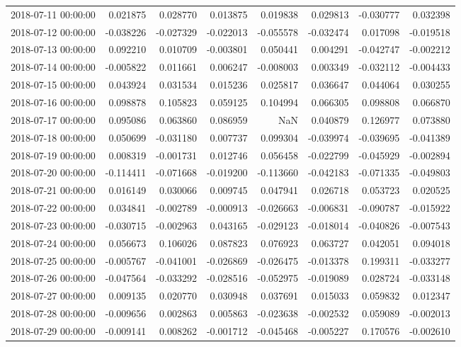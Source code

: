\begin{tabular}{lrrrrrrr}
2018-07-11 00:00:00 & 0.021875 & 0.028770 & 0.013875 & 0.019838 & 0.029813 & -0.030777 & 0.032398 \\
2018-07-12 00:00:00 & -0.038226 & -0.027329 & -0.022013 & -0.055578 & -0.032474 & 0.017098 & -0.019518 \\
2018-07-13 00:00:00 & 0.092210 & 0.010709 & -0.003801 & 0.050441 & 0.004291 & -0.042747 & -0.002212 \\
2018-07-14 00:00:00 & -0.005822 & 0.011661 & 0.006247 & -0.008003 & 0.003349 & -0.032112 & -0.004433 \\
2018-07-15 00:00:00 & 0.043924 & 0.031534 & 0.015236 & 0.025817 & 0.036647 & 0.044064 & 0.030255 \\
2018-07-16 00:00:00 & 0.098878 & 0.105823 & 0.059125 & 0.104994 & 0.066305 & 0.098808 & 0.066870 \\
2018-07-17 00:00:00 & 0.095086 & 0.063860 & 0.086959 & NaN & 0.040879 & 0.126977 & 0.073880 \\
2018-07-18 00:00:00 & 0.050699 & -0.031180 & 0.007737 & 0.099304 & -0.039974 & -0.039695 & -0.041389 \\
2018-07-19 00:00:00 & 0.008319 & -0.001731 & 0.012746 & 0.056458 & -0.022799 & -0.045929 & -0.002894 \\
2018-07-20 00:00:00 & -0.114411 & -0.071668 & -0.019200 & -0.113660 & -0.042183 & -0.071335 & -0.049803 \\
2018-07-21 00:00:00 & 0.016149 & 0.030066 & 0.009745 & 0.047941 & 0.026718 & 0.053723 & 0.020525 \\
2018-07-22 00:00:00 & 0.034841 & -0.002789 & -0.000913 & -0.026663 & -0.006831 & -0.090787 & -0.015922 \\
2018-07-23 00:00:00 & -0.030715 & -0.002963 & 0.043165 & -0.029123 & -0.018014 & -0.040826 & -0.007543 \\
2018-07-24 00:00:00 & 0.056673 & 0.106026 & 0.087823 & 0.076923 & 0.063727 & 0.042051 & 0.094018 \\
2018-07-25 00:00:00 & -0.005767 & -0.041001 & -0.026869 & -0.026475 & -0.013378 & 0.199311 & -0.033277 \\
2018-07-26 00:00:00 & -0.047564 & -0.033292 & -0.028516 & -0.052975 & -0.019089 & 0.028724 & -0.033148 \\
2018-07-27 00:00:00 & 0.009135 & 0.020770 & 0.030948 & 0.037691 & 0.015033 & 0.059832 & 0.012347 \\
2018-07-28 00:00:00 & -0.009656 & 0.002863 & 0.005863 & -0.023638 & -0.002532 & 0.059089 & -0.002013 \\
2018-07-29 00:00:00 & -0.009141 & 0.008262 & -0.001712 & -0.045468 & -0.005227 & 0.170576 & -0.002610 \\

\end{tabular}
